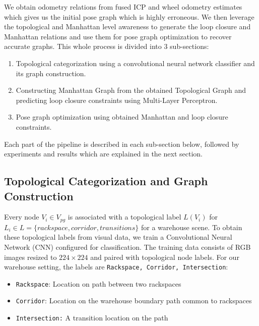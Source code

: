 \documentclass[letterpaper, 10 pt, conference]{ieeeconf}  %
\begin{document}
	We obtain odometry relations from fused ICP and wheel odometry estimates which gives us the initial pose graph which is highly erroneous. We then leverage the topological and Manhattan level awareness to generate the loop closure and Manhattan relations and use them for pose graph optimization to recover accurate graphs. This whole process is divided into 3 sub-sections:
	
	\begin{enumerate}
		\item Topological categorization using a convolutional neural network classifier and its graph construction.
		\item Constructing Manhattan Graph from the obtained Topological Graph and predicting loop closure constraints using Multi-Layer Perceptron.
		\item Pose graph optimization using obtained Manhattan and loop closure constraints.
	\end{enumerate}
	
	Each part of the pipeline is described in each sub-section below, followed by experiments and results which are explained in the next section.
	
	\subsection{Topological Categorization and Graph Construction}
	\label{sec:semantic_place_cat}
	
	
	Every node $V_{i} \in V_{pg} $ is associated with a topological label $L(V_{i})$ for $L_{i} \in L=\{rackspace, corridor, transitions\}$ for a warehouse scene. To obtain these topological labels from visual data, we train a Convolutional Neural Network (CNN) configured for classification. The training data consists of RGB images resized to $224 \times 224$ and paired with topological node labels. For our warehouse setting, the labels are \texttt{Rackspace, Corridor, Intersection}:
	\begin{itemize}
		\item \texttt{Rackspace}: Location on path between two rackspaces
		\item \texttt{Corridor}: Location on the warehouse boundary path common to rackspaces
		\item \texttt{Intersection:} A transition location on the path 
	\end{itemize} 
	
\end{document}
